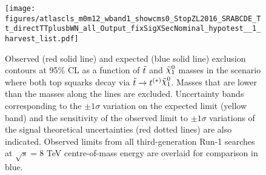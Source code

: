 %
%
%
%
%






\begin{figure}[htpb]
  \begin{center} \texttt{[image: figures/atlascls\_m0m12\_wband1\_showcms0\_StopZL2016\_SRABCDE\_Tt\_directTTplusbWN\_all\_Output\_fixSigXSecNominal\_hypotest\_\_1\_harvest\_list.pdf]}%
    \caption[Exclusion contours as a function of $\stop$ and
      $\ninoone$ masses in the scenario where both top squarks decay
      via $\stop\to t^{(*)} \ninoone$.]{Observed (red solid line) and expected (blue solid line)
      exclusion contours at 95\% CL as a function of $\stop$ and
      $\ninoone$ masses in the scenario where both top squarks decay
      via $\stop\to t^{(*)} \ninoone$. Masses that are lower than the masses along the lines are excluded. Uncertainty bands corresponding to the $\pm 1
      \sigma$ variation on the expected limit (yellow band) and the
      sensitivity of the observed limit to $\pm 1\sigma$ variations of
      the signal theoretical uncertainties (red dotted lines) are also
      indicated. Observed limits from all third-generation Run-1 searches~\cite{Atlas8TeVSummary} at $\sqrt{s}=8$ TeV centre-of-mass energy are overlaid for comparison in blue.}
    \label{fig:SRABC_exclusion}%
  \end{center}
\end{figure}
\clearpage

